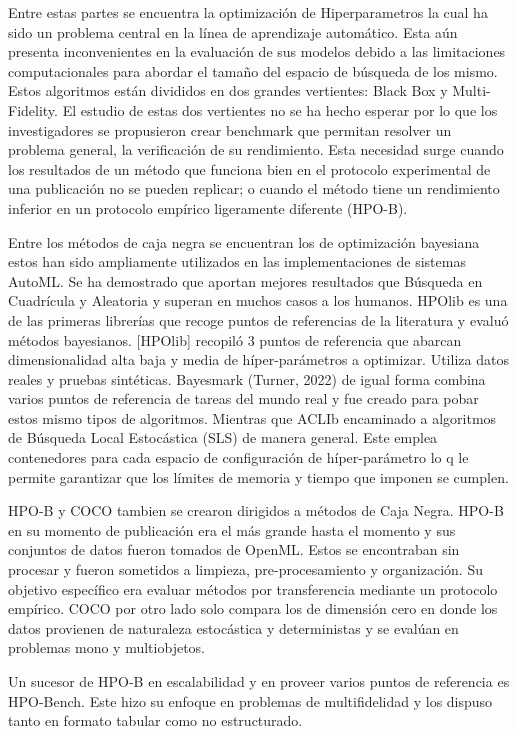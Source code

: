 Entre estas partes se encuentra la optimización de Hiperparametros la cual ha sido un problema central en la línea de aprendizaje automático. Esta aún presenta 
inconvenientes en la evaluación de sus modelos debido a las limitaciones computacionales para abordar el tamaño del espacio de búsqueda de los mismo. Estos algoritmos 
están divididos en dos grandes vertientes: Black Box y Multi-Fidelity. El estudio de estas dos vertientes no se ha hecho esperar por lo que los investigadores se 
propusieron crear benchmark que permitan resolver un problema general, la verificación de su rendimiento.  Esta necesidad surge cuando los resultados de un método que funciona 
bien en el protocolo experimental de una publicación no se pueden replicar; o cuando el método tiene un rendimiento inferior en un protocolo empírico ligeramente 
diferente (HPO-B). 

Entre los métodos de caja negra se encuentran los de optimización bayesiana estos han sido ampliamente utilizados en las implementaciones de sistemas AutoML. Se ha 
demostrado que aportan mejores resultados que Búsqueda en Cuadrícula y Aleatoria y superan en muchos casos a los humanos. HPOlib es una de las primeras librerías que 
recoge puntos de referencias de la literatura y evaluó métodos bayesianos.  [HPOlib] recopiló 3 puntos de referencia que abarcan dimensionalidad alta baja y media de 
híper-parámetros a optimizar. Utiliza datos reales y pruebas sintéticas. Bayesmark (Turner,  2022) de igual forma combina varios puntos de referencia de tareas del 
mundo real y fue creado para pobar estos mismo tipos de algoritmos. Mientras que ACLIb encaminado a algoritmos de Búsqueda Local Estocástica (SLS) de manera 
general. Este emplea contenedores para cada espacio de configuración de híper-parámetro lo q le permite garantizar que los límites de memoria y tiempo que imponen se 
cumplen. 

HPO-B y COCO tambien se crearon dirigidos a métodos de Caja Negra. HPO-B  en su momento de publicación era el más grande hasta el momento y sus conjuntos de datos fueron tomados de OpenML. Estos se encontraban sin procesar y fueron sometidos a limpieza, pre-procesamiento y organización. 
Su objetivo específico era evaluar métodos por transferencia mediante un protocolo empírico. COCO por otro lado solo compara los de dimensión cero en donde los datos 
provienen de naturaleza estocástica y deterministas y se evalúan en problemas mono y multiobjetos.

Un sucesor de HPO-B en escalabilidad y en proveer varios puntos de referencia es HPO-Bench. Este hizo su enfoque en problemas de multifidelidad y los dispuso tanto en 
formato tabular como no estructurado. 

